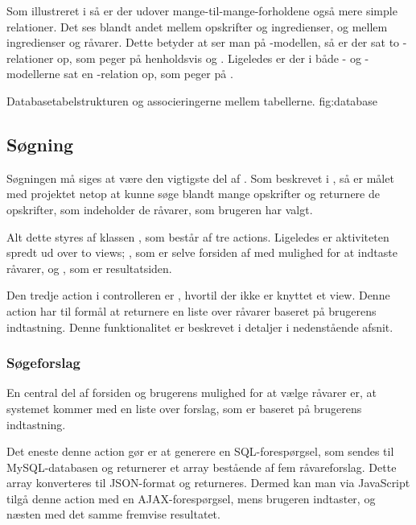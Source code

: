 Som illustreret i  så er der udover mange-til-mange-forholdene også mere simple relationer. Det ses blandt andet mellem opskrifter og ingredienser, og mellem ingredienser og råvarer. Dette betyder at ser man på -modellen, så er der sat to -relationer op, som peger på henholdsvis  og . Ligeledes er der i både - og -modellerne sat en -relation op, som peger på .

  {Databasetabelstrukturen og associeringerne mellem tabellerne.}
  {fig:database}

\subsection{Søgning}
\label{sec:funktionalitet-soegning}
Søgningen må siges at være den vigtigste del af \Foodl{}. Som beskrevet i , så er målet med projektet netop at kunne søge blandt mange opskrifter og returnere de opskrifter, som indeholder de råvarer, som brugeren har valgt.

Alt dette styres af klassen , som består af tre actions. Ligeledes er aktiviteten spredt ud over to views; , som er selve forsiden af \Foodl{} med mulighed for at indtaste råvarer, og , som er resultatsiden.

Den tredje action i controlleren er , hvortil der ikke er knyttet et view. Denne action har til formål at returnere en liste over råvarer baseret på brugerens indtastning. Denne funktionalitet er beskrevet i detaljer i nedenstående afsnit.

\subsubsection{Søgeforslag}
En central del af forsiden og brugerens mulighed for at vælge råvarer er, at systemet kommer med en liste over forslag, som er baseret på brugerens indtastning.

Det eneste denne action gør er at generere en SQL-forespørgsel, som sendes til MySQL-databasen og returnerer et array bestående af fem råvareforslag. Dette array konverteres til JSON-format og returneres. Dermed kan man via JavaScript tilgå denne action med en AJAX-forespørgsel, mens brugeren indtaster, og næsten med det samme fremvise resultatet.

